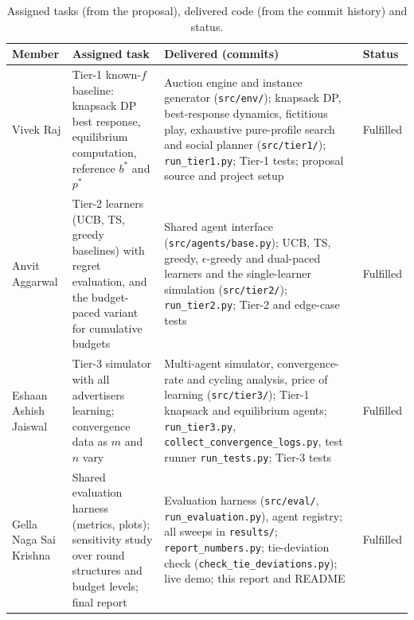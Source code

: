 \documentclass{article}
\theoremstyle{definition}
\begin{document}
\begin{table}[h]
\caption{Assigned tasks (from the proposal), delivered code (from the commit history) and status.}\label{tab:contrib}
\centering\footnotesize
\begin{tabularx}{\linewidth}{@{}>{\raggedright\arraybackslash}p{2.1cm}>{\raggedright\arraybackslash}X>{\raggedright\arraybackslash}X>{\raggedright\arraybackslash}p{1.45cm}@{}}
\toprule
Member & Assigned task & Delivered (commits) & Status\\
\midrule
Vivek Raj & Tier-1 known-$f$ baseline: knapsack DP best response, equilibrium computation, reference
$b^\ast$ and $p^\ast$ &
Auction engine and instance generator (\texttt{src/env/}); knapsack DP, best-response dynamics, fictitious
play, exhaustive pure-profile search and social planner (\texttt{src/tier1/}); \texttt{run\_tier1.py}; Tier-1
tests; proposal source and project setup & Fulfilled\\
Anvit Aggarwal & Tier-2 learners (UCB, TS, greedy baselines) with regret evaluation, and the budget-paced
variant for cumulative budgets & Shared agent interface (\texttt{src/agents/base.py}); UCB, TS, greedy,
$\epsilon$-greedy and dual-paced learners and the single-learner simulation (\texttt{src/tier2/});
\texttt{run\_tier2.py}; Tier-2 and edge-case tests & Fulfilled\\
Eshaan Ashish Jaiswal & Tier-3 simulator with all advertisers learning; convergence data as $m$ and $n$ vary &
Multi-agent simulator, convergence-rate and cycling analysis, price of learning (\texttt{src/tier3/});
Tier-1 knapsack and equilibrium agents; \texttt{run\_tier3.py}, \texttt{collect\_convergence\_logs.py},
test runner \texttt{run\_tests.py}; Tier-3 tests & Fulfilled\\
Gella Naga Sai Krishna & Shared evaluation harness (metrics, plots); sensitivity study over round structures
and budget levels; final report & Evaluation harness (\texttt{src/eval/},
\texttt{run\_evaluation.py}), agent registry; all sweeps in \texttt{results/}; \texttt{report\_numbers.py};
tie-deviation check (\texttt{check\_tie\_deviations.py}); live demo; this report and README & Fulfilled\\
\bottomrule
\end{tabularx}
\end{table}
\end{document}
